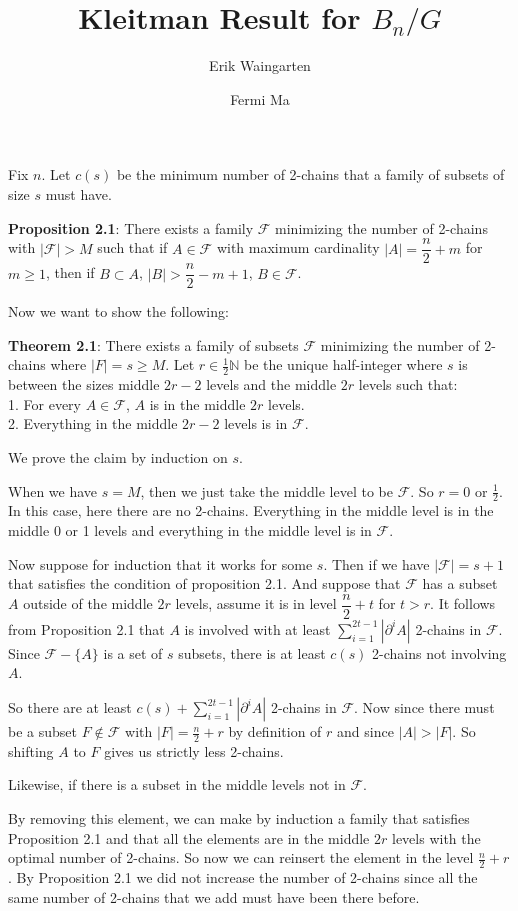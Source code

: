 \documentclass[11pt]{article}
\author{Erik Waingarten \and Fermi Ma}
\title{Kleitman Result for $B_n/G$}
\newcommand{\F}{\mathcal{F}}
\begin{document}
         
\maketitle

Fix $n$. Let $c(s)$ be the minimum number of 2-chains that a family of subsets of size $s$ must have. 

\textbf{Proposition 2.1}: There exists a family $\F$ minimizing the number of 2-chains with $|\F| > M$ such that if $A \in \F$ with maximum cardinality $|A| = \dfrac{n}{2} + m$ for $m \geq 1$, then if $B \subset A$, $|B| > \dfrac{n}{2}-m+1$, $B \in \F$. 

Now we want to show the following:

\textbf{Theorem 2.1}: There exists a family of subsets $\F$ minimizing the number of 2-chains where $|F| = s \geq M$. Let $r \in \frac{1}{2}\mathbb{N}$ be the unique half-integer where $s$ is between the sizes middle $2r-2$ levels and the middle $2r$ levels such that:\\
1. For every $A \in \F$, $A$ is in the middle $2r$ levels.\\
2. Everything in the middle $2r-2$ levels is in $\F$.

We prove the claim by induction on $s$. 

When we have $s = M$, then we just take the middle level to be $\F$. So $r = 0$ or $\frac{1}{2}$. In this case, here there are no 2-chains. Everything in the middle level is in the middle 0 or 1 levels and everything in the middle level is in $\F$. 

Now suppose for induction that it works for some $s$. Then if we have $|\F| = s + 1$ that satisfies the condition of proposition 2.1. And suppose that $\F$ has a subset $A$ outside of the middle $2r$ levels, assume it is in level $\dfrac{n}{2} + t$ for $t > r$. It follows from Proposition 2.1 that $A$ is involved with at least $\sum_{i=1}^{2t-1} |\partial^i A|$ 2-chains in $\F$. Since $\F - \{A \}$ is a set of $s$ subsets, there is at least $c(s)$ 2-chains not involving $A$. 

So there are at least $c(s) + \sum_{i=1}^{2t-1} |\partial^i A|$ 2-chains in $\F$. Now since there must be a subset $F \notin \F$ with $|F| = \frac{n}{2}+r$ by definition of $r$ and since $|A| > |F|$. So shifting $A$ to $F$ gives us strictly less 2-chains.  

Likewise, if there is a subset in the middle levels not in $\F$.

By removing this element, we can make by induction a family that satisfies Proposition 2.1 and that all the elements are in the middle $2r$ levels with the optimal number of 2-chains. So now we can reinsert the element in the level $\frac{n}{2} + r$. By Proposition 2.1 we did not increase the number of 2-chains since all the same number of 2-chains that we add must have been there before. 
\end{document}
